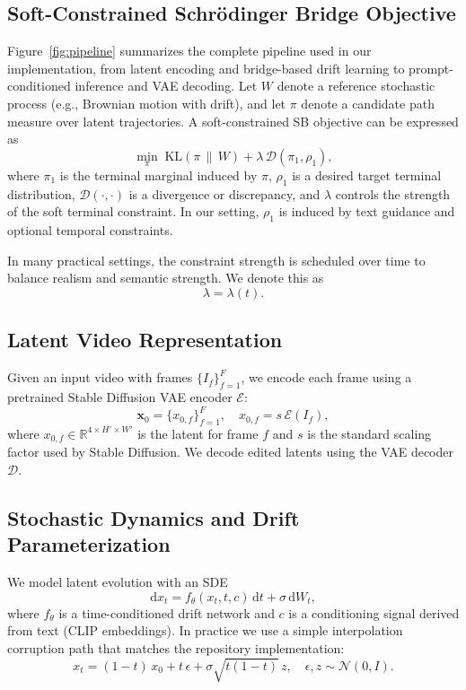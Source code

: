 \documentclass[journal]{IEEEtran}
\begin{document}
\subsection{Soft-Constrained Schr\"{o}dinger Bridge Objective}
Figure~\ref{fig:pipeline} summarizes the complete pipeline used in our implementation, from latent encoding and bridge-based drift learning to prompt-conditioned inference and VAE decoding.
Let $W$ denote a reference stochastic process (e.g., Brownian motion with drift), and let $\pi$ denote a candidate path measure over latent trajectories. A soft-constrained SB objective can be expressed as
\begin{equation}
\min_{\pi}\; \mathrm{KL}(\pi\,\|\,W) + \lambda\, \mathcal{D}(\pi_1,\rho_1),
\label{eq:sb_objective}
\end{equation}
where $\pi_1$ is the terminal marginal induced by $\pi$, $\rho_1$ is a desired target terminal distribution, $\mathcal{D}(\cdot,\cdot)$ is a divergence or discrepancy, and $\lambda$ controls the strength of the soft terminal constraint. In our setting, $\rho_1$ is induced by text guidance and optional temporal constraints.

In many practical settings, the constraint strength is scheduled over time to balance realism and semantic strength. We denote this as
\begin{equation}
\lambda = \lambda(t).
\label{eq:lambda_schedule}
\end{equation}

\subsection{Latent Video Representation}
Given an input video with frames $\{I_f\}_{f=1}^{F}$, we encode each frame using a pretrained Stable Diffusion VAE encoder $\mathcal{E}$:
\begin{equation}
\mathbf{x}_0 = \{x_{0,f}\}_{f=1}^{F},\quad x_{0,f} = s\,\mathcal{E}(I_f),
\end{equation}
where $x_{0,f}\in\mathbb{R}^{4\times H'\times W'}$ is the latent for frame $f$ and $s$ is the standard scaling factor used by Stable Diffusion. We decode edited latents using the VAE decoder $\mathcal{D}$.

\subsection{Stochastic Dynamics and Drift Parameterization}
We model latent evolution with an SDE
\begin{equation}
\mathrm{d}x_t = f_{\theta}(x_t,t, c)\,\mathrm{d}t + \sigma\,\mathrm{d}W_t,
\label{eq:sde}
\end{equation}
where $f_{\theta}$ is a time-conditioned drift network and $c$ is a conditioning signal derived from text (CLIP embeddings). In practice we use a simple interpolation corruption path that matches the repository implementation:
\begin{equation}
 x_t = (1-t)\,x_0 + t\,\epsilon + \sigma\sqrt{t(1-t)}\,z, \quad \epsilon,z\sim\mathcal{N}(0,I).
\label{eq:corruption_path}
\end{equation}
\end{document}

